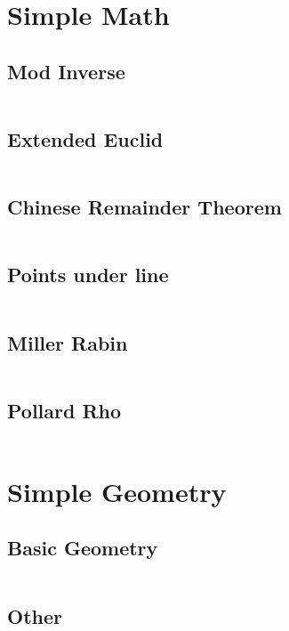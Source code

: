 \documentclass[a4paper]{article}
\begin{document}
  \section{Simple Math}
  
  \subsection{Mod Inverse}
  \inputminted{cpp}{src/inverse.cpp}
  
  \subsection{Extended Euclid}
  \inputminted{cpp}{src/extended-euclid.cpp}
  
  \subsection{Chinese Remainder Theorem}
  \inputminted{cpp}{src/chinese-remainder.cpp}
  
  \subsection{Points under line}
  \inputminted{cpp}{src/lattice-count.cpp}
  
  \subsection{Miller Rabin}
  \inputminted{cpp}{src/miller-rabin.cpp}
  
  \subsection{Pollard Rho}
  \inputminted{cpp}{src/pollard-rho.cpp}
  
  \section{Simple Geometry}
  
  \subsection{Basic Geometry}
  \inputminted{cpp}{src/geom_library.cpp}
  
  \subsection{Other}
  \inputminted{cpp}{src/our/advanced.cpp}
  
\end{document}
